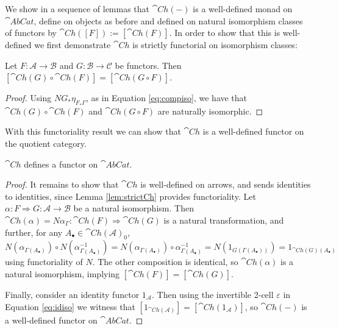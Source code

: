 We show in a sequence of lemmas that $\cat{Ch}(-)$ is a well-defined monad on $\cat{AbCat}$, define on objects as before and defined on natural isomorphism classes of functors by $\cat{Ch}([F]) := [\cat{Ch}(F)]$. In order to show that this is well-defined we first demonstrate $\cat{Ch}$ is strictly functorial on isomorphism classes:

\begin{lem}[label=lem:strictCh]
    Let $F:\mathcal{A}\rightarrow \mathcal{B}$ and $G:\mathcal{B}\rightarrow \mathcal{C}$ be functors. Then $[\cat{Ch}(G)\circ \cat{Ch}(F)] = [\cat{Ch}(G\circ F)]$.
\end{lem}
\begin{proof}
    Using $NG_*\eta_{F_*\Gamma}$, as in Equation \eqref{eq:compiso}, we have that $\cat{Ch}(G)\circ \cat{Ch}(F)$ and $\cat{Ch}(G\circ F)$ are naturally isomorphic.
\end{proof}

With this functoriality result we can show that $\cat{Ch}$ is a well-defined functor on the quotient category.

\begin{lem}[label=lem:functCh]
    $\cat{Ch}$ defines a functor on $\cat{AbCat}$.
\end{lem}
\begin{proof}
    It remains to show that $\cat{Ch}$ is well-defined on arrows, and sends identities to identities, since Lemma \ref{lem:strictCh} provides functoriality. Let $\alpha:F\Rightarrow G:\mathcal{A}\rightarrow \mathcal{B}$ be a natural isomorphism. Then $\cat{Ch}(\alpha) = N\alpha_{\Gamma}:\cat{Ch}(F)\Rightarrow \cat{Ch}(G)$ is a natural transformation, and further, for any $A_\bullet \in \cat{Ch}(\mathcal{A})_0$,
    \begin{equation*}
        N(\alpha_{\Gamma(A_\bullet)}) \circ N(\alpha^{-1}_{\Gamma(A_\bullet)}) = N(\alpha_{\Gamma(A_\bullet)})\circ \alpha^{-1}_{\Gamma(A_\bullet)} = N(1_{G(\Gamma(A_\bullet))}) = 1_{\cat{Ch}(G)(A_\bullet)} 
    \end{equation*}
    using functoriality of $N$. The other composition is identical, so $\cat{Ch}(\alpha)$ is a natural isomorphism, implying $[\cat{Ch}(F)] = [\cat{Ch}(G)]$. 

    Finally, consider an identity functor $1_\mathcal{A}$. Then using the invertible 2-cell $\varepsilon$ in Equation \eqref{eq:idiso} we witness that $[1_{\cat{Ch}(\mathcal{A})}] = [\cat{Ch}(1_{\mathcal{A}})]$, so $\cat{Ch}(-)$ is a well-defined functor on $\cat{AbCat}$.
\end{proof}



